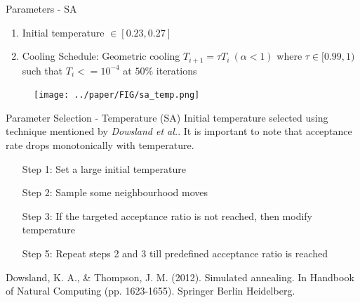 \documentclass{beamer}
\begin{document}
\begin{frame}[t]{Parameters - SA}
    \begin{enumerate}
        \item Initial temperature $\in [0.23, 0.27]$
        \item Cooling Schedule: Geometric cooling $T_{i+1} = \tau T_{i}~ (\alpha < 1)$ where $\tau \in [0.99, 1)$ such that $T_i <= 10^{-4}$ at $50\%$ iterations
    \end{enumerate}
    \begin{figure}
        \centering
        \texttt{[image: ../paper/FIG/sa\_temp.png]}
    \end{figure}

\end{frame}

\begin{frame}{Parameter Selection - Temperature (SA)}
    Initial temperature selected using technique mentioned by \textit{Dowsland et al.}. It is important to note that acceptance rate drops monotonically with temperature. 
    \vspace*{.5cm}
    \begin{enumerate}
        \item [Step 1:] Set a large initial temperature
        \item [Step 2:] Sample some neighbourhood moves
        \item [Step 3:] If the targeted acceptance ratio is not reached, then modify temperature 
        \item [Step 5:] Repeat steps 2 and 3 till predefined acceptance ratio is reached 
    \end{enumerate}
    {\tiny Dowsland, K. A., \& Thompson, J. M. (2012). Simulated annealing. In Handbook of Natural Computing (pp. 1623-1655). Springer Berlin Heidelberg. }
\end{frame}
\end{document}
